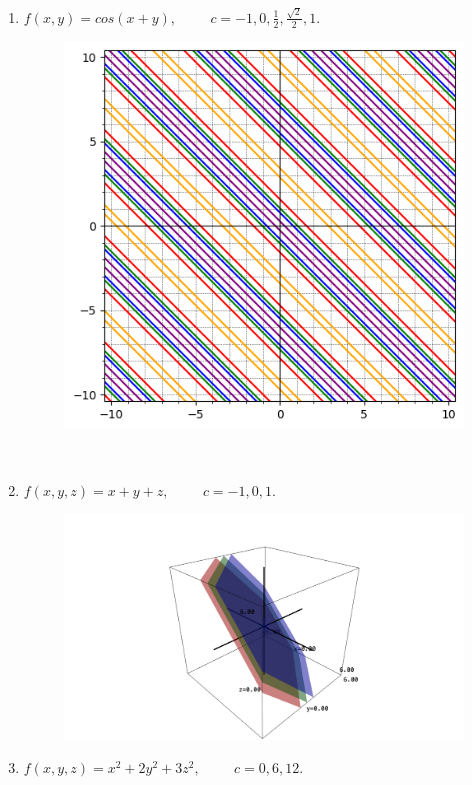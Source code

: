 \documentclass{article}
\begin{document}
\begin{enumerate}
\begin{enumerate}[label=1.\arabic*.]
\begin{enumerate}[label=(\alph*)]
\begin{figure}[!ht]
                \label{fig:imagem1}
            \end{figure}
            \item $f(x, y) = cos(x+y), \hspace{1cm} c = -1, 0, \frac{1}{2}, \frac{\sqrt{2}}{2}, 1.$
            \begin{figure}[!ht]
                \centering 
                \includegraphics[width=0.7\linewidth]{imgs/nivel3.png} 
                \label{fig:imagem1}
            \end{figure} \\
            \item $f(x, y, z) = x + y + z, \hspace{1cm} c = -1, 0, 1.$
            \begin{figure}[!ht]
                \centering 
                \includegraphics[width=0.7\linewidth]{imgs/nivel4.png} 
                \label{fig:imagem1}
            \end{figure}
            \item $f(x, y, z) = x^2 + 2y^2 + 3z^2, \hspace{1cm} c = 0, 6, 12.$
            \begin{figure}[!ht]

\end{figure}
\end{enumerate}
\end{enumerate}
\end{enumerate}
\end{document}
